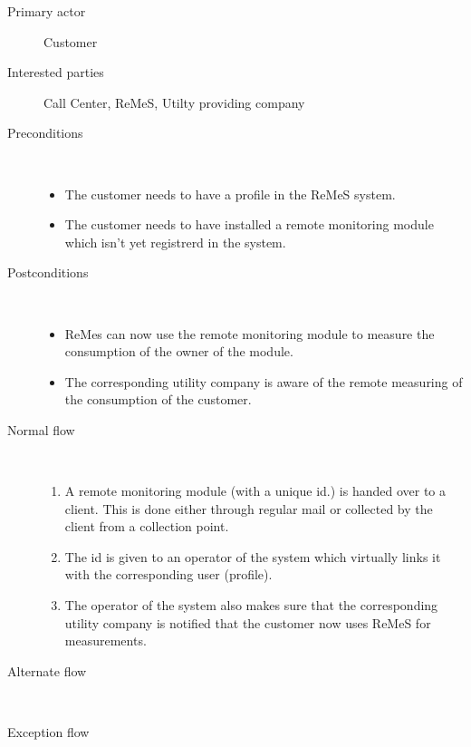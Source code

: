 \begin{description}
	\item[Primary actor] Customer
	\item[Interested parties] Call Center, ReMeS, Utilty providing company
	\item[Preconditions] \ 
	\begin{itemize}
		\item The customer needs to have a profile in the ReMeS system.
		\item The customer needs to have installed a remote monitoring module which
		isn't yet registrerd in the system.
	\end{itemize}
	\item[Postconditions] \ 
	\begin{itemize}
		\item ReMes can now use the remote monitoring module to measure the
		consumption of the owner of the module.
		\item The corresponding utility company is aware of the remote measuring of
		the consumption of the customer.
	\end{itemize}
	\item[Normal flow] \ 
	\begin{enumerate}
	  	\item A remote monitoring module (with a unique id.) is handed over to a
	  	client. This is done either through regular mail or collected by the client
	  	from a collection point.
	  	\item The id is given to an operator of the system which virtually links it
	  	with the corresponding user (profile).
	  	\item The operator of the system also makes sure that the corresponding
	  	utility company is notified that the customer now uses ReMeS for
	  	measurements.
	\end{enumerate}
	\item[Alternate flow] \ 
	\begin{description}
		\item 
	\end{description}
	\item[Exception flow] \ 
	\begin{description}
		\item 
	\end{description}
\end{description}